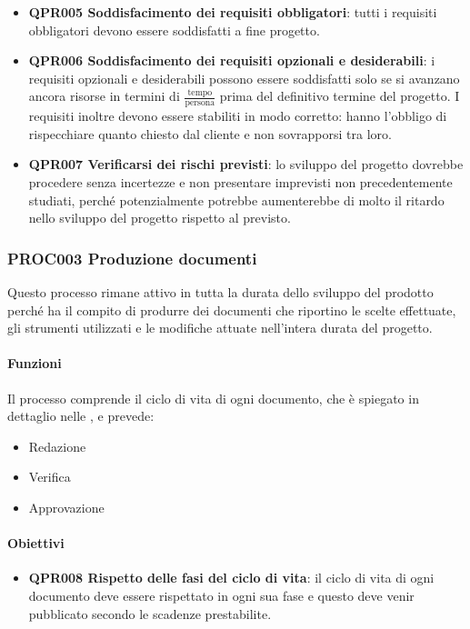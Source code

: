 		\begin{itemize}
			\item \textbf{QPR005 Soddisfacimento dei requisiti obbligatori}: tutti i requisiti obbligatori devono essere soddisfatti a fine progetto.
			\item \textbf{QPR006 Soddisfacimento dei requisiti opzionali e desiderabili}: i requisiti opzionali e desiderabili possono essere soddisfatti
				solo se si avanzano ancora risorse in termini di $ \frac{\text{tempo}}{\text{persona}}$ prima del definitivo termine del progetto. 
				I requisiti inoltre devono essere stabiliti in modo corretto: hanno l'obbligo di rispecchiare quanto chiesto dal cliente e non sovrapporsi tra loro.
			\item \textbf{QPR007 Verificarsi dei rischi previsti}: lo sviluppo del progetto dovrebbe procedere senza incertezze e non presentare imprevisti non precedentemente studiati, perché potenzialmente potrebbe aumenterebbe di molto il ritardo nello sviluppo del progetto rispetto al previsto.
		\end{itemize}
	
	\subsubsection{PROC003 Produzione documenti}
	Questo processo rimane attivo in tutta la durata dello sviluppo del prodotto perché ha il compito di produrre dei documenti che riportino le scelte effettuate, gli strumenti utilizzati e le modifiche attuate nell'intera durata del progetto.
	
		\paragraph*{Funzioni}
		Il processo comprende il ciclo di vita di ogni documento, che è spiegato in dettaglio nelle \NdPv, e prevede:
		
		\begin{itemize}
			\item Redazione
			\item Verifica
			\item Approvazione
		\end{itemize}
	
		\paragraph*{Obiettivi}
		
		\begin{itemize}
			\item \textbf{QPR008 Rispetto delle fasi del ciclo di vita}: il ciclo di vita di ogni documento deve essere rispettato in ogni sua fase e questo deve venir pubblicato secondo le scadenze prestabilite. 
		\end{itemize}

